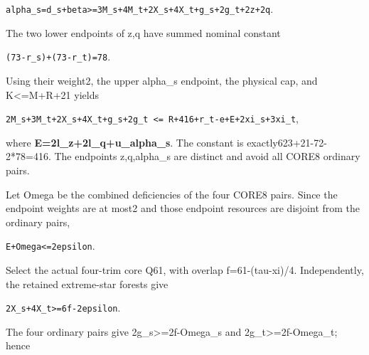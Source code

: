 \documentclass[10pt,a4paper]{article}
\theoremstyle{definition}
\begin{document}
\texttt{alpha\_\allowbreak{}\allowbreak{}s=\allowbreak{}d\_\allowbreak{}\allowbreak{}s+\allowbreak{}beta>=\allowbreak{}3M\_\allowbreak{}\allowbreak{}s+\allowbreak{}4M\_\allowbreak{}\allowbreak{}t+\allowbreak{}2X\_\allowbreak{}\allowbreak{}s+\allowbreak{}4X\_\allowbreak{}\allowbreak{}t+\allowbreak{}g\_\allowbreak{}\allowbreak{}s+\allowbreak{}2g\_\allowbreak{}\allowbreak{}t+\allowbreak{}2z+\allowbreak{}2q}.

The two lower endpoints of z,\allowbreak{}q have summed nominal constant

\texttt{(73-r\_\allowbreak{}\allowbreak{}s)+\allowbreak{}(73-r\_\allowbreak{}\allowbreak{}t)=\allowbreak{}78}.

Using their weight2,\allowbreak{} the upper alpha\_\allowbreak{}s endpoint,\allowbreak{} the physical cap,\allowbreak{} and
K\textless=\allowbreak{}M+\allowbreak{}R+\allowbreak{}21 yields

\texttt{2M\_\allowbreak{}\allowbreak{}s+\allowbreak{}3M\_\allowbreak{}\allowbreak{}t+\allowbreak{}2X\_\allowbreak{}\allowbreak{}s+\allowbreak{}4X\_\allowbreak{}\allowbreak{}t+\allowbreak{}g\_\allowbreak{}\allowbreak{}s+\allowbreak{}2g\_\allowbreak{}\allowbreak{}t <=\allowbreak{} R+\allowbreak{}416+\allowbreak{}r\_\allowbreak{}\allowbreak{}t-e+\allowbreak{}E+\allowbreak{}2xi\_\allowbreak{}\allowbreak{}s+\allowbreak{}3xi\_\allowbreak{}\allowbreak{}t},\allowbreak{}

where \textbf{E=\allowbreak{}2l\_\allowbreak{}z+\allowbreak{}2l\_\allowbreak{}q+\allowbreak{}u\_\allowbreak{}alpha\_\allowbreak{}s}. The constant is
exactly623+\allowbreak{}21-72-2*78=\allowbreak{}416. The endpoints z,\allowbreak{}q,\allowbreak{}alpha\_\allowbreak{}s are distinct and
avoid all CORE8 ordinary pairs.

Let Omega be the combined deficiencies of the four CORE8 pairs. Since
the endpoint weights are at most2 and those endpoint resources are
disjoint from the ordinary pairs,\allowbreak{}

\texttt{E+\allowbreak{}Omega<=\allowbreak{}2epsilon}.

Select the actual four-trim core Q61,\allowbreak{} with overlap f=\allowbreak{}61-(tau-xi)/4.
Independently,\allowbreak{} the retained extreme-star forests give

\texttt{2X\_\allowbreak{}\allowbreak{}s+\allowbreak{}4X\_\allowbreak{}\allowbreak{}t>=\allowbreak{}6f-2epsilon}.

The four ordinary pairs give 2g\_\allowbreak{}s\textgreater=\allowbreak{}2f-Omega\_\allowbreak{}s and
2g\_\allowbreak{}t\textgreater=\allowbreak{}2f-Omega\_\allowbreak{}t; hence
\end{document}
